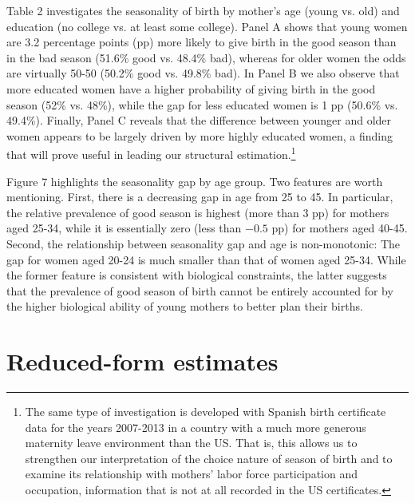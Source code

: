 \documentclass[a4paper, 12 pt]{article}
\theoremstyle{plain}
\begin{document}
\begin{doublespace}
Table 2 investigates the seasonality of birth by mother's age (young vs. old) and education (no college vs. at least some college). Panel A shows that young women are 3.2 percentage points (pp) more likely to give birth in the good season than in the bad season (51.6\% good vs. 48.4\% bad), whereas for older women the odds are virtually 50-50 (50.2\% good vs. 49.8\% bad). In Panel B we also observe that more educated women have a higher probability of giving birth in the good season (52\% vs. 48\%), while the gap for less educated women is 1 pp (50.6\% vs. 49.4\%). Finally, Panel C reveals that the difference between younger and older women appears to be largely driven by more highly educated women, a finding that will prove useful in leading our structural estimation.\footnote{The same type of investigation is developed with Spanish birth certificate data for the years 2007-2013 in a country with a much more generous maternity leave environment than the US. That is, this allows us to strengthen our interpretation of the choice nature of season of birth and to examine its relationship with mothers' labor force participation and occupation, information that is not at all recorded in the US certificates.}

Figure 7 highlights the seasonality gap by age group. Two features are worth mentioning. First, there is a decreasing gap in age from 25 to 45. In particular, the relative prevalence of good season is highest (more than 3 pp) for mothers aged 25-34, while it is essentially zero (less than $-0.5$ pp) for mothers aged 40-45. Second, the relationship between seasonality gap and age is non-monotonic: The gap for women aged 20-24 is much smaller than that of women aged 25-34. While the former feature is consistent with biological constraints, the latter suggests that the prevalence of good season of birth cannot be entirely accounted for by the higher biological ability of young mothers to better plan their births.

\newpage
\section{Reduced-form estimates}

\end{doublespace}
\end{document}
